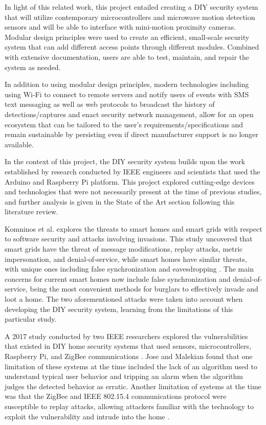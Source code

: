 \documentclass[conference]{IEEEtran}
\begin{document}
In light of this related work, this project entailed creating a DIY security system that
will utilize contemporary microcontrollers and microwave motion detection sensors and
will be able to interface with mini-motion proximity cameras. Modular design principles
were used to create an efficient, small-scale security system that can add different access
points through different modules. Combined with extensive documentation, users are able
to test, maintain, and repair the system as needed.

In addition to using modular design principles, modern technologies including using Wi-Fi
to connect to remote servers and notify users of events with SMS text messaging as well
as web protocols to broadcast the history of detections/captures and enact security
network management, allow for an open ecosystem that can be tailored to the user’s
requirements/specifications and remain sustainable by persisting even if direct
manufacturer support is no longer available.

In the context of this project, the DIY security system builds upon the work established
by research conducted by IEEE engineers and scientists that used the Arduino and
Raspberry Pi platform. This project explored cutting-edge devices and technologies
that were not necessarily present at the time of previous studies, and further analysis
is given in the State of the Art section following this literature review.

Komninos et al. explores the threats to smart homes and smart grids with respect to
software security and attacks involving invasions. This study uncovered that smart grids
have the threat of message modifications, replay attacks, metric impersonation, and
denial-of-service, while smart homes have similar threats, with unique ones including
false synchronization and eavesdropping \cite{komninosEtAl2014}. The main concerns for
current smart homes now include false synchronization and denial-of-service, being the
most convenient methods for burglars to effectively invade and loot a home. The two
aforementioned attacks were taken into account when developing the DIY security system,
learning from the limitations of this particular study.

A 2017 study conducted by two IEEE researchers explored the vulnerabilities that existed
in DIY home security systems that used sensors, microcontrollers, Raspberry Pi, and ZigBee
communications \cite{joseMalekian2017}. Jose and Malekian found that one limitation of
these systems at the time included the lack of an algorithm used to understand typical
user behavior and tripping an alarm when the algorithm judges the detected behavior as
erratic. Another limitation of systems at the time was that the ZigBee and IEEE 802.15.4
communications protocol were susceptible to replay attacks, allowing attackers familiar
with the technology to exploit the vulnerability and intrude
into the home \cite{joseMalekian2017}.
\end{document}
